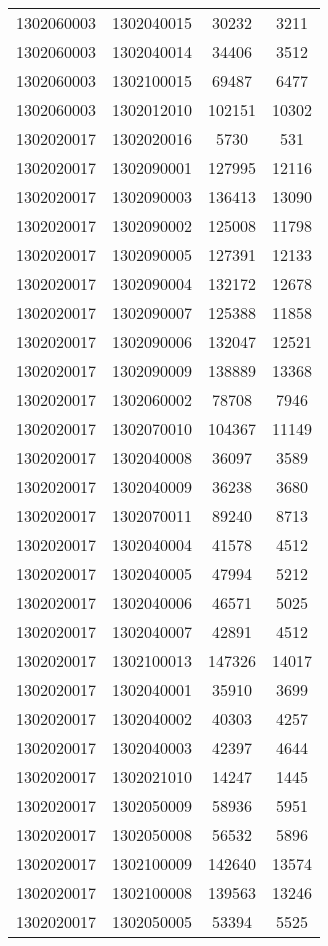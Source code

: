 \begin{longtable}[h]{llcc}
		1302060003 & 1302040015 & 30232 & 3211\\
		1302060003 & 1302040014 & 34406 & 3512\\
		1302060003 & 1302100015 & 69487 & 6477\\
		1302060003 & 1302012010 & 102151 & 10302\\
		1302020017 & 1302020016 & 5730 & 531\\
		1302020017 & 1302090001 & 127995 & 12116\\
		1302020017 & 1302090003 & 136413 & 13090\\
		1302020017 & 1302090002 & 125008 & 11798\\
		1302020017 & 1302090005 & 127391 & 12133\\
		1302020017 & 1302090004 & 132172 & 12678\\
		1302020017 & 1302090007 & 125388 & 11858\\
		1302020017 & 1302090006 & 132047 & 12521\\
		1302020017 & 1302090009 & 138889 & 13368\\
		1302020017 & 1302060002 & 78708 & 7946\\
		1302020017 & 1302070010 & 104367 & 11149\\
		1302020017 & 1302040008 & 36097 & 3589\\
		1302020017 & 1302040009 & 36238 & 3680\\
		1302020017 & 1302070011 & 89240 & 8713\\
		1302020017 & 1302040004 & 41578 & 4512\\
		1302020017 & 1302040005 & 47994 & 5212\\
		1302020017 & 1302040006 & 46571 & 5025\\
		1302020017 & 1302040007 & 42891 & 4512\\
		1302020017 & 1302100013 & 147326 & 14017\\
		1302020017 & 1302040001 & 35910 & 3699\\
		1302020017 & 1302040002 & 40303 & 4257\\
		1302020017 & 1302040003 & 42397 & 4644\\
		1302020017 & 1302021010 & 14247 & 1445\\
		1302020017 & 1302050009 & 58936 & 5951\\
		1302020017 & 1302050008 & 56532 & 5896\\
		1302020017 & 1302100009 & 142640 & 13574\\
		1302020017 & 1302100008 & 139563 & 13246\\
		1302020017 & 1302050005 & 53394 & 5525\\

\end{longtable}
